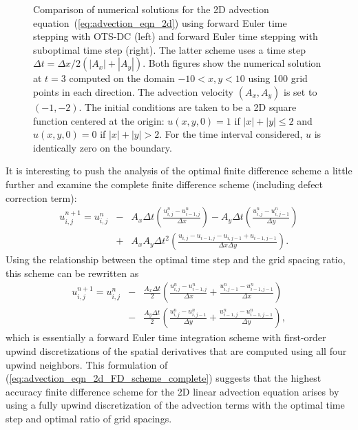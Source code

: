 \documentclass[fleqn,12pt,twoside]{article}
\newcommand{\bea}{\begin{eqnarray}}
\newcommand{\eea}{\end{eqnarray}}
\def\dt{\Delta t}
\def\dx{\Delta x}
\def\dy{\Delta y}
\begin{document}
\begin{figure}[tb]
\begin{center}
\caption{Comparison of numerical solutions for the 2D advection
equation~(\ref{eq:advection_eqn_2d}) using forward Euler time stepping 
with OTS-DC (left) and forward Euler time 
stepping with suboptimal time step (right).  The latter scheme uses a 
time step $\Delta t = \Delta x / 2 (|A_x|+|A_y|)$.  
Both figures show the numerical solution at $t = 3$ computed on the domain 
$-10 < x,y < 10$ using 100 grid points in each direction.
The advection velocity $(A_x, A_y)$ is set to $(-1, -2)$.  The initial 
conditions are taken to be a 2D square function centered at the
origin: $u(x,y,0) = 1$ if $|x| + |y| \le 2$ and 
$u(x,y,0) = 0$ if $|x| + |y| > 2$. 
For the time interval considered, $u$ is identically zero 
on the boundary.
}
\label{fig:advection_eqn_2d_soln}
\end{center}
\end{figure}

It is interesting to push the analysis of the optimal finite difference 
scheme a little further and examine the complete finite difference scheme
(including defect correction term):
\bea
  u^{n+1}_{i,j} = u^{n}_{i,j}
  &-& A_x \dt \left( \frac{u^{n}_{i,j} - u^{n}_{i-1,j}}{\dx} \right)
  - A_y \dt \left( \frac{u^{n}_{i,j} - u^{n}_{i,j-1}}{\dy} \right)
  \nonumber \\
  &+& A_x A_y \dt^2 
        \left( \frac{u_{i,j} - u_{i-1,j} - u_{i,j-1} + u_{i-1,j-1}}
                    {\dx \dy} 
        \right).
  \label{eq:advection_eqn_2d_FD_scheme_complete}
\eea
Using the relationship between the optimal time step and the grid spacing
ratio, this scheme can be rewritten as
\bea
  u^{n+1}_{i,j} = u^{n}_{i,j}
  &-& \frac{A_x \dt}{2}
    \left( \frac{u^{n}_{i,j} - u^{n}_{i-1,j}}{\dx} 
         + \frac{u^{n}_{i,j-1} - u^{n}_{i-1,j-1}}{\dx} 
    \right)
  \nonumber \\
  &-& \frac{A_y \dt}{2}
    \left( \frac{u^{n}_{i,j} - u^{n}_{i,j-1}}{\dy} 
         + \frac{u^{n}_{i-1,j} - u^{n}_{i-1,j-1}}{\dy} 
    \right),
  \label{eq:advection_eqn_2d_FD_scheme_simplified}
\eea
which is essentially a forward Euler time integration scheme with 
first-order upwind discretizations of the spatial derivatives that are 
computed using all four upwind neighbors.  This formulation of 
(\ref{eq:advection_eqn_2d_FD_scheme_complete}) suggests that the highest
accuracy finite difference scheme for the 2D linear advection equation arises
by using a fully upwind discretization of the advection terms with the 
optimal time step and optimal ratio of grid spacings.
\end{document}
